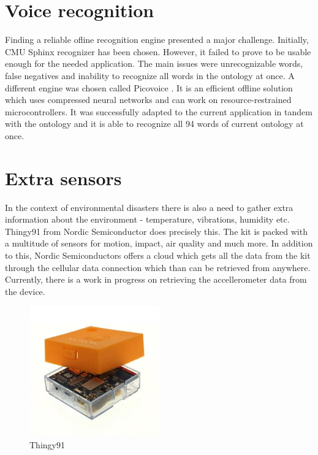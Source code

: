 \documentclass[conference]{IEEEtran}
\begin{document}
\section{Voice recognition}

Finding a reliable ofline recognition engine presented a major challenge. Initially,
CMU Sphinx recognizer \cite{sphinx} has been chosen. However, it failed to prove to be usable enough for the needed application. The main issues were unrecognizable words, false negatives and inability to recognize all words in the ontology at once. A different engine was chosen called Picovoice \cite{pico}. It is an efficient offline solution which uses compressed neural networks and can work on resource-restrained microcontrollers. It was successfully adapted to the current application in tandem with the ontology and it is able to recognize all 94 words of current ontology at once. 

\section{Extra sensors}

In the context of environmental disasters there is also a need to gather extra information about the environment - temperature, vibrations, humidity etc. Thingy91 from Nordic Semiconductor \cite{thingy} does precisely this. The kit is packed with a multitude of sensors for motion, impact, air quality and much more. In addition to this, Nordic Semiconductors offers a cloud which gets all the data from the kit through the cellular data connection which than can be retrieved from anywhere. Currently, there is a work in progress on retrieving the accellerometer data from the device. 

\begin{figure}[htbp]
    \centerline{\includegraphics[width=0.5\textwidth,height=0.2\textheight,keepaspectratio]{Pictures/NRF6943.jpg}}
    \caption{Thingy91}

    \label{thingy_pic}
\end{figure}
\end{document}
